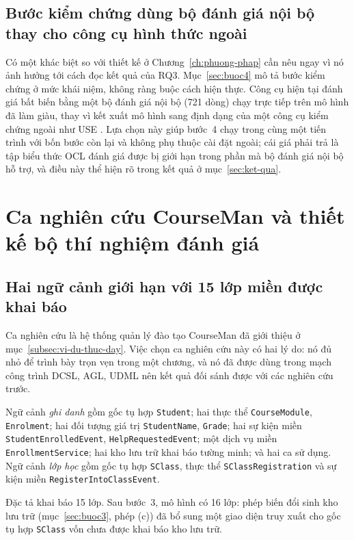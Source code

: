 \subsection{Bước kiểm chứng dùng bộ đánh giá nội bộ thay cho công cụ hình thức ngoài}

Có một khác biệt so với thiết kế ở Chương~\ref{ch:phuong-phap} cần nêu ngay vì nó ảnh hưởng tới cách đọc kết quả của RQ3. Mục~\ref{sec:buoc4} mô tả bước kiểm chứng ở mức khái niệm, không ràng buộc cách hiện thực. Công cụ hiện tại đánh giá bất biến bằng một bộ đánh giá nội bộ (721 dòng) chạy trực tiếp trên mô hình đã làm giàu, thay vì kết xuất mô hình sang định dạng của một công cụ kiểm chứng ngoài như USE \citep{gogolla2007}. Lựa chọn này giúp bước~4 chạy trong cùng một tiến trình với bốn bước còn lại và không phụ thuộc cài đặt ngoài; cái giá phải trả là tập biểu thức OCL đánh giá được bị giới hạn trong phần mà bộ đánh giá nội bộ hỗ trợ, và điều này thể hiện rõ trong kết quả ở mục~\ref{sec:ket-qua}.

\section{Ca nghiên cứu CourseMan và thiết kế bộ thí nghiệm đánh giá}
\label{sec:ca-nghien-cuu}

\subsection{Hai ngữ cảnh giới hạn với 15 lớp miền được khai báo}

Ca nghiên cứu là hệ thống quản lý đào tạo CourseMan đã giới thiệu ở mục~\ref{subsec:vi-du-thuc-day}. Việc chọn ca nghiên cứu này có hai lý do: nó đủ nhỏ để trình bày trọn vẹn trong một chương, và nó đã được dùng trong mạch công trình DCSL, AGL, UDML \citep{le2018dcsl,dang2023agl,le2025udml} nên kết quả đối sánh được với các nghiên cứu trước.

Ngữ cảnh \emph{ghi danh} gồm gốc tụ hợp \texttt{Student}; hai thực thể \texttt{CourseModule}, \texttt{Enrolment}; hai đối tượng giá trị \texttt{StudentName}, \texttt{Grade}; hai sự kiện miền \texttt{StudentEnrolledEvent}, \texttt{HelpRequestedEvent}; một dịch vụ miền \texttt{EnrollmentService}; hai kho lưu trữ khai báo tường minh; và hai ca sử dụng. Ngữ cảnh \emph{lớp học} gồm gốc tụ hợp \texttt{SClass}, thực thể \texttt{SClassRegistration} và sự kiện miền \texttt{RegisterIntoClassEvent}.

Đặc tả khai báo 15 lớp. Sau bước~3, mô hình có 16 lớp: phép biến đổi sinh kho lưu trữ (mục~\ref{sec:buoc3}, phép (c)) đã bổ sung một giao diện truy xuất cho gốc tụ hợp \texttt{SClass} vốn chưa được khai báo kho lưu trữ.


